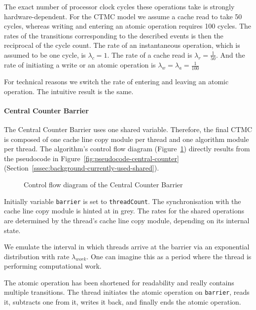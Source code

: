 \documentclass[a4paper, 10pt]{article}
\begin{document}
The exact number of processor clock cycles these operations take is strongly hardware-dependent. For the CTMC model we assume a cache read to take 50 cycles, whereas writing and entering an atomic operation requires 100 cycles. The rates of the transitions corresponding to the described events is then the reciprocal of the cycle count.
The rate of an instantaneous operation, which is assumed to be one cycle, is $\lambda_c = 1$. The rate of a cache read is $\lambda_r = \frac{1}{50}$. And the rate of initiating a write or an atomic operation is $\lambda_w = \lambda_a = \frac{1}{100}$

For technical reasons we switch the rate of entering and leaving an atomic operation. The intuitive result is the same.

\paragraph{Central Counter Barrier}
\label{sssec:analysis-modelchecking-modelling-central-counter}
The Central Counter Barrier uses one shared variable. Therefore, the final CTMC is composed of one cache line copy module per thread and one algorithm module per thread.
The algorithm's control flow diagram (Figure~\ref{fig:model-central-counter}) directly results from the pseudocode in Figure~\ref{fig:pseudocode-central-counter} (Section~\ref{sssec:background-currently-used-shared}).

\begin{figure}[htbp]
	\centering
	
	\caption{Control flow diagram of the Central Counter Barrier}
	\label{fig:model-central-counter}
\end{figure}

Initially variable \texttt{barrier} is set to \texttt{threadCount}.
The synchronisation with the cache line copy module is hinted at in grey.
The rates for the shared operations are determined by the thread's cache line copy module, depending on its internal state.

We emulate the interval in which threads arrive at the barrier via an exponential distribution with rate $\lambda_{\mathit{work}}$. One can imagine this as a period where the thread is performing computational work.

The atomic operation has been shortened for readability and really contains multiple transitions. The thread initiates the atomic operation on \texttt{barrier}, reads it, subtracts one from it, writes it back, and finally ends the atomic operation.
\end{document}
